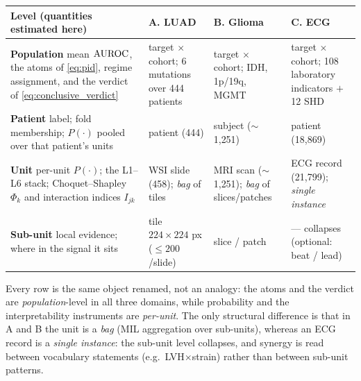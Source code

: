 \footnotesize
\setlength{\tabcolsep}{4pt}
\renewcommand{\arraystretch}{1.15}
\begin{tabularx}{\linewidth}{>{\raggedright\arraybackslash}p{3.0cm} X X X}
\toprule
\textbf{Level (quantities estimated here)} &
  \textbf{A. LUAD} &
  \textbf{B. Glioma} &
  \textbf{C. ECG} \\
\midrule
\textbf{Population} \newline mean $\text{AUROC}$, the \pid{} atoms of
  \cref{eq:pid}, regime assignment, and the verdict of
  \cref{eq:conclusive_verdict}
  & target $\times$ cohort; 6 mutations over 444 patients
  & target $\times$ cohort; IDH, 1p/19q, MGMT
  & target $\times$ cohort; 108 laboratory indicators $+$ 12 SHD \\
\midrule
\textbf{Patient} \newline label; fold membership; $P(\cdot)$ pooled
  over that patient's units
  & patient (444)
  & subject ($\sim$1{,}251)
  & patient (18{,}869) \\
\midrule
\textbf{Unit} \newline per-unit $P(\cdot)$; the L1--L6 stack;
  Choquet--Shapley $\Phi_k$ and interaction indices $I_{jk}$
  & WSI slide (458); \emph{bag} of tiles
  & MRI scan ($\sim$1{,}251); \emph{bag} of slices/patches
  & ECG record (21{,}799); \emph{single instance} \\
\midrule
\textbf{Sub-unit} \newline local evidence; where in the signal it sits
  & tile $224\!\times\!224$ px ($\leq\!200$/slide)
  & slice / patch
  & --- collapses (optional: beat / lead) \\
\bottomrule
\end{tabularx}
\begin{flushleft}\footnotesize
Every row is the same object renamed, not an analogy: the \pid{} atoms and
the verdict are \emph{population}-level in all three domains, while
probability and the interpretability instruments are \emph{per-unit}.
The only structural difference is that in A and B the unit is a
\emph{bag} (MIL aggregation over sub-units), whereas an ECG record is a
\emph{single instance}: the sub-unit level collapses, and synergy is
read between vocabulary statements (e.g.\ LVH$\times$strain) rather than
between sub-unit patterns.
\end{flushleft}

